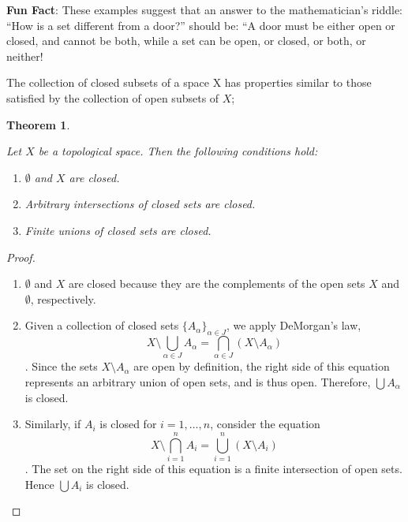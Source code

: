 \documentclass[
]{book}
\providecommand{\tightlist}{%
  \setlength{\itemsep}{0pt}\setlength{\parskip}{0pt}}
\newtheorem{theorem}{Theorem}[chapter]
\theoremstyle{definition}
\theoremstyle{definition}
\theoremstyle{definition}
\theoremstyle{definition}
\theoremstyle{remark}
\begin{document}
\textbf{Fun Fact}: These examples suggest that an answer to the mathematician's riddle: ``How is a set different from a door?'' should be: ``A door must be either open or closed, and cannot be both, while a set can be open, or closed, or both, or neither!

The collection of closed subsets of a space X has properties similar to those satisfied by the collection of open subsets of \(X\);

\begin{theorem}
\protect\hypertarget{thm:unnamed-chunk-59}{}\label{thm:unnamed-chunk-59}

Let \(X\) be a topological space. Then the following conditions hold:

\begin{enumerate}
\def\labelenumi{(\arabic{enumi})}
\tightlist
\item
  \(\emptyset\) and \(X\) are closed.
\item
  Arbitrary intersections of closed sets are closed.
\item
  Finite unions of closed sets are closed.
\end{enumerate}

\end{theorem}

\begin{proof}
\leavevmode

\begin{enumerate}
\def\labelenumi{\arabic{enumi})}
\tightlist
\item
  \(\emptyset\) and \(X\) are closed because they are the complements of the open sets \(X\) and \(\emptyset\), respectively.
\item
  Given a collection of closed sets \(\{A_{\alpha}\}_{\alpha \in J}\), we apply DeMorgan's law, \[X \setminus \bigcup_{\alpha \in J} A_{\alpha} = \bigcap_{\alpha \in J} (X \setminus A_{\alpha})\]. Since the sets \(X \setminus A_{\alpha}\) are open by definition, the right side of this equation represents an arbitrary union of open sets, and is thus open. Therefore, \(\bigcup A_{\alpha}\) is closed.
\item
  Similarly, if \(A_i\) is closed for \(i = 1, \ldots, n\), consider the equation \[X \setminus \bigcap_{i=1}^{n} A_i = \bigcup_{i=1}^{n} (X \setminus A_i)\].
  The set on the right side of this equation is a finite intersection of open sets. Hence \(\bigcup A_i\) is closed.
\end{enumerate}

\end{proof}
\end{document}
